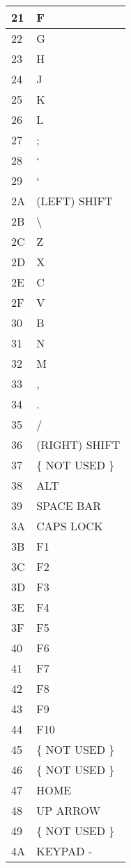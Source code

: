 \documentclass[a4paper,8pt,english]{sphinxmanual}
\begin{document}
\begin{longtable}{|l|l|}
\hline
21
 & 
F
\\
\hline
22
 & 
G
\\
\hline
23
 & 
H
\\
\hline
24
 & 
J
\\
\hline
25
 & 
K
\\
\hline
26
 & 
L
\\
\hline
27
 & 
;
\\
\hline
28
 & 
`
\\
\hline
29
 & 
{}`
\\
\hline
2A
 & 
(LEFT) SHIFT
\\
\hline
2B
 & 
\textbackslash{}
\\
\hline
2C
 & 
Z
\\
\hline
2D
 & 
X
\\
\hline
2E
 & 
C
\\
\hline
2F
 & 
V
\\
\hline
30
 & 
B
\\
\hline
31
 & 
N
\\
\hline
32
 & 
M
\\
\hline
33
 & 
,
\\
\hline
34
 & 
.
\\
\hline
35
 & 
/
\\
\hline
36
 & 
(RIGHT) SHIFT
\\
\hline
37
 & 
\{ NOT USED \}
\\
\hline
38
 & 
ALT
\\
\hline
39
 & 
SPACE BAR
\\
\hline
3A
 & 
CAPS LOCK
\\
\hline
3B
 & 
F1
\\
\hline
3C
 & 
F2
\\
\hline
3D
 & 
F3
\\
\hline
3E
 & 
F4
\\
\hline
3F
 & 
F5
\\
\hline
40
 & 
F6
\\
\hline
41
 & 
F7
\\
\hline
42
 & 
F8
\\
\hline
43
 & 
F9
\\
\hline
44
 & 
F10
\\
\hline
45
 & 
\{ NOT USED \}
\\
\hline
46
 & 
\{ NOT USED \}
\\
\hline
47
 & 
HOME
\\
\hline
48
 & 
UP ARROW
\\
\hline
49
 & 
\{ NOT USED \}
\\
\hline
4A
 & 
KEYPAD -
\\

\end{longtable}
\end{document}
